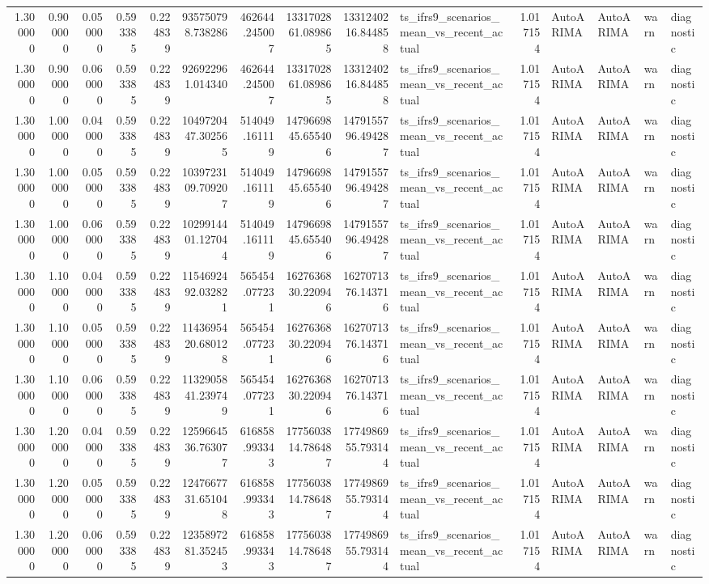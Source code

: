 \begin{tabular}{rrrrrrrrrlrllll}
1.300000 & 0.900000 & 0.050000 & 0.593385 & 0.224839 & 935750798.738286 & 462644.245007 & 1331702861.089865 & 1331240216.844858 & ts_ifrs9_scenarios_mean_vs_recent_actual & 1.017154 & AutoARIMA & AutoARIMA & warn & diagnostic \\
1.300000 & 0.900000 & 0.060000 & 0.593385 & 0.224839 & 926922961.014340 & 462644.245007 & 1331702861.089865 & 1331240216.844858 & ts_ifrs9_scenarios_mean_vs_recent_actual & 1.017154 & AutoARIMA & AutoARIMA & warn & diagnostic \\
1.300000 & 1.000000 & 0.040000 & 0.593385 & 0.224839 & 1049720447.302565 & 514049.161119 & 1479669845.655406 & 1479155796.494287 & ts_ifrs9_scenarios_mean_vs_recent_actual & 1.017154 & AutoARIMA & AutoARIMA & warn & diagnostic \\
1.300000 & 1.000000 & 0.050000 & 0.593385 & 0.224839 & 1039723109.709207 & 514049.161119 & 1479669845.655406 & 1479155796.494287 & ts_ifrs9_scenarios_mean_vs_recent_actual & 1.017154 & AutoARIMA & AutoARIMA & warn & diagnostic \\
1.300000 & 1.000000 & 0.060000 & 0.593385 & 0.224839 & 1029914401.127044 & 514049.161119 & 1479669845.655406 & 1479155796.494287 & ts_ifrs9_scenarios_mean_vs_recent_actual & 1.017154 & AutoARIMA & AutoARIMA & warn & diagnostic \\
1.300000 & 1.100000 & 0.040000 & 0.593385 & 0.224839 & 1154692492.032821 & 565454.077231 & 1627636830.220946 & 1627071376.143716 & ts_ifrs9_scenarios_mean_vs_recent_actual & 1.017154 & AutoARIMA & AutoARIMA & warn & diagnostic \\
1.300000 & 1.100000 & 0.050000 & 0.593385 & 0.224839 & 1143695420.680128 & 565454.077231 & 1627636830.220946 & 1627071376.143716 & ts_ifrs9_scenarios_mean_vs_recent_actual & 1.017154 & AutoARIMA & AutoARIMA & warn & diagnostic \\
1.300000 & 1.100000 & 0.060000 & 0.593385 & 0.224839 & 1132905841.239749 & 565454.077231 & 1627636830.220946 & 1627071376.143716 & ts_ifrs9_scenarios_mean_vs_recent_actual & 1.017154 & AutoARIMA & AutoARIMA & warn & diagnostic \\
1.300000 & 1.200000 & 0.040000 & 0.593385 & 0.224839 & 1259664536.763077 & 616858.993343 & 1775603814.786487 & 1774986955.793144 & ts_ifrs9_scenarios_mean_vs_recent_actual & 1.017154 & AutoARIMA & AutoARIMA & warn & diagnostic \\
1.300000 & 1.200000 & 0.050000 & 0.593385 & 0.224839 & 1247667731.651048 & 616858.993343 & 1775603814.786487 & 1774986955.793144 & ts_ifrs9_scenarios_mean_vs_recent_actual & 1.017154 & AutoARIMA & AutoARIMA & warn & diagnostic \\
1.300000 & 1.200000 & 0.060000 & 0.593385 & 0.224839 & 1235897281.352453 & 616858.993343 & 1775603814.786487 & 1774986955.793144 & ts_ifrs9_scenarios_mean_vs_recent_actual & 1.017154 & AutoARIMA & AutoARIMA & warn & diagnostic \\
\bottomrule
\end{tabular}

